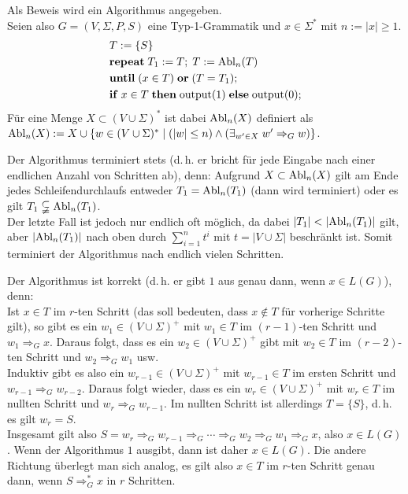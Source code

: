 \begin{Beweis}
    Als Beweis wird ein Algorithmus angegeben.\\
    Seien also $G = (V, \Sigma, P, S)$ eine Typ-1-Grammatik und
    $x \in \Sigma^\ast$ mit $n := |x| \ge 1$.
    \begin{align*}&
        T := \{S\}\\&
        \mathbf{repeat}\; T_1 := T;\; T := \text{Abl}_n(T)\\&
        \mathbf{until}\; (x \in T) \;\mathbf{or}\; (T = T_1);\\&
        \mathbf{if}\; x \in T \;\mathbf{then}\;
        \text{output}(1) \;\mathbf{else}\;
        \text{output}(0);
    \end{align*}
    Für eine Menge $X \subset (V \cup \Sigma)^\ast$ ist dabei
    $\text{Abl}_n(X)$ definiert als\\
    $\text{Abl}_n(X) := X \cup \{w \in (V \cup \Sigma)^\ast \;|\;
    (|w| \le n) \land (\exists_{w' \in X}\; w' \Rightarrow_G w)\}$.

    Der Algorithmus terminiert stets
    (d.\,h. er bricht für jede Eingabe nach einer
    endlichen Anzahl von Schritten ab), denn:
    Aufgrund $X \subset \text{Abl}_n(X)$ gilt am Ende jedes Schleifendurchlaufs
    entweder $T_1 = \text{Abl}_n(T_1)$ (dann wird terminiert) oder es gilt
    $T_1 \subsetneqq \text{Abl}_n(T_1)$.\\
    Der letzte Fall ist jedoch nur endlich oft möglich, da
    dabei $|T_1| < |\text{Abl}_n(T_1)|$ gilt, aber
    $|\text{Abl}_n(T_1)|$ nach oben durch $\sum_{i=1}^n t^i$ mit
    $t = |V \cup \Sigma|$ beschränkt ist.
    Somit terminiert der Algorithmus nach endlich vielen Schritten.

    Der Algorithmus ist korrekt
    (d.\,h. er gibt $1$ aus genau dann, wenn $x \in L(G)$), denn:\\
    Ist $x \in T$ im $r$-ten Schritt
    (das soll bedeuten, dass $x \notin T$ für vorherige Schritte gilt),
    so gibt es ein $w_1 \in (V \cup \Sigma)^+$ mit $w_1 \in T$
    im $(r - 1)$-ten Schritt und $w_1 \Rightarrow_G x$.
    Daraus folgt, dass es ein $w_2 \in (V \cup \Sigma)^+$ gibt mit $w_2 \in T$
    im $(r - 2)$-ten Schritt und $w_2 \Rightarrow_G w_1$ usw.\\
    Induktiv gibt es also ein $w_{r-1} \in (V \cup \Sigma)^+$ mit
    $w_{r-1} \in T$ im ersten Schritt und $w_{r-1} \Rightarrow_G w_{r-2}$.
    Daraus folgt wieder, dass es ein $w_r \in (V \cup \Sigma)^+$ mit
    $w_r \in T$ im nullten Schritt und $w_r \Rightarrow_G w_{r-1}$.
    Im nullten Schritt ist allerdings $T = \{S\}$, d.\,h. es gilt $w_r = S$.\\
    Insgesamt gilt also $S = w_r \Rightarrow_G w_{r-1} \Rightarrow_G \dotsb
    \Rightarrow_G w_2 \Rightarrow_G w_1 \Rightarrow_G x$, also
    $x \in L(G)$.
    Wenn der Algorithmus $1$ ausgibt, dann ist daher $x \in L(G)$.
    Die andere Richtung überlegt man sich analog, es gilt also
    $x \in T$ im $r$-ten Schritt genau dann, wenn $S \Rightarrow_G^\ast x$
    in $r$ Schritten.
\end{Beweis}


